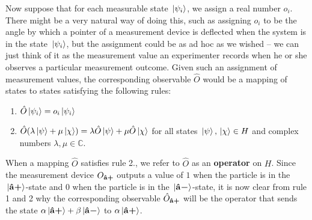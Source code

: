 Now suppose that for each measurable state $\ket*{\psi_i}$, we assign a real number $o_i$. %
%
There might be a very natural way of doing this, such as assigning  $o_i$ to be the angle by which a pointer of a measurement device is deflected when the system is in the state $\ket*{\psi_i}$,  %
%
but the assignment could be as ad hoc as we wished – we can just think of it as the measurement value an experimenter records when he or she observes a particular measurement outcome. Given such an assignment of measurement values, the corresponding observable $\hat{O}$ would be a mapping of states to states satisfying the following rules:
\begin{enumerate}[noitemsep, nosep, topsep=0pt]
\item $\hat{O}\ket*{\psi_i}=o_i\ket*{\psi_i}$
\item $\hat{O}(\lambda\ket*{\psi}+\mu\ket*{\chi})=\lambda\hat{O}\ket*{\psi}+\mu\hat{O}\ket*{\chi}$  for all states $\ket*{\psi},\ket*{\chi}\in H$ and complex numbers $\lambda,\mu\in\mathbb{C}$.
\end{enumerate}
When a mapping $\hat{O}$ satisfies rule 2., we refer to $\hat{O}$ as an \textbf{operator} on $H$. Since the measurement device $O_{{\vb{\hat{{a}}}\bm{+}}}$ outputs a value of $1$ when the particle is in the $\ket*{{\vb{\hat{{a}}}\bm{+}}}$-state and $0$ when the particle is in the $\ket*{{\vb{\hat{{a}}}\bm{-}}}$-state, it is now clear from rule 1 and 2 why the corresponding observable $\hat{O}_{{\vb{\hat{{a}}}\bm{+}}}$ will be the operator that sends the state $\alpha\ket*{{\vb{\hat{{a}}}\bm{+}}}+\beta\ket*{{\vb{\hat{{a}}}\bm{-}}}$ to $\alpha\ket*{{\vb{\hat{{a}}}\bm{+}}}$.

